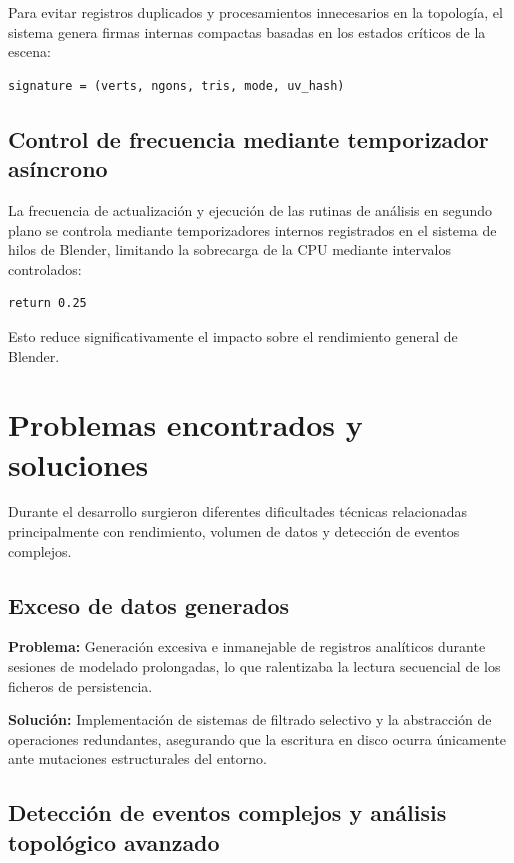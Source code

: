 Para evitar registros duplicados y procesamientos innecesarios en la topología, el sistema genera firmas internas compactas basadas en los estados críticos de la escena:
\begin{verbatim}
signature = (verts, ngons, tris, mode, uv_hash)
\end{verbatim}

\subsection{Control de frecuencia mediante temporizador asíncrono}

La frecuencia de actualización y ejecución de las rutinas de análisis en segundo plano se controla mediante temporizadores internos registrados en el sistema de hilos de Blender, limitando la sobrecarga de la CPU mediante intervalos controlados:
\begin{verbatim}
return 0.25
\end{verbatim}

Esto reduce significativamente el impacto sobre el rendimiento general de Blender.

\section{Problemas encontrados y soluciones}

Durante el desarrollo surgieron diferentes dificultades técnicas relacionadas principalmente con rendimiento, volumen de datos y detección de eventos complejos.

\subsection{Exceso de datos generados}

\textbf{Problema:} Generación excesiva e inmanejable de registros analíticos durante sesiones de modelado prolongadas, lo que ralentizaba la lectura secuencial de los ficheros de persistencia.

\textbf{Solución:} Implementación de sistemas de filtrado selectivo y la abstracción de operaciones redundantes, asegurando que la escritura en disco ocurra únicamente ante mutaciones estructurales del entorno.

\subsection{Detección de eventos complejos y análisis topológico avanzado}

